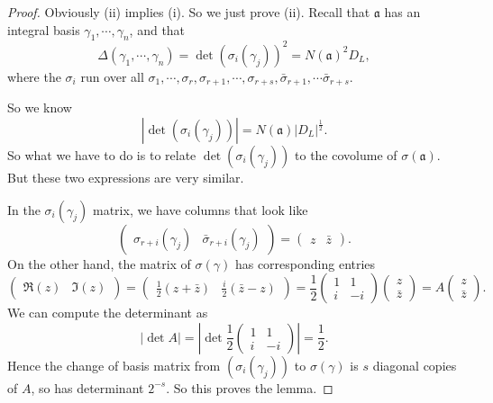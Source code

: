 \documentclass[a4paper]{article}
\begin{document}
\begin{proof}
  Obviously (ii) implies (i). So we just prove (ii). Recall that $\mathfrak{a}$ has an integral basis $\gamma_1, \cdots, \gamma_n$, and that
  \[
    \Delta(\gamma_1, \cdots, \gamma_n) = \det (\sigma_i(\gamma_j))^2 = N(\mathfrak{a})^2 D_L,
  \]
  where the $\sigma_i$ run over all $\sigma_1, \cdots, \sigma_r, \sigma_{r + 1}, \cdots, \sigma_{r + s}, \bar{\sigma}_{r + 1}, \cdots \bar{\sigma}_{r + s}$.

  So we know
  \[
    |\det (\sigma_i(\gamma_j))| = N(\mathfrak{a}) |D_L|^{\frac{1}{2}}.
  \]
  So what we have to do is to relate $\det(\sigma_i(\gamma_j))$ to the covolume of $\sigma(\mathfrak{a})$. But these two expressions are very similar.

  In the $\sigma_i (\gamma_j)$ matrix, we have columns that look like
  \[
    \begin{pmatrix}
      \sigma_{r + i}(\gamma_j) & \bar{\sigma}_{r + i}(\gamma_j)
    \end{pmatrix} =
    \begin{pmatrix}
      z & \bar{z}
    \end{pmatrix}.
  \]
  On the other hand, the matrix of $\sigma(\gamma)$ has corresponding entries
  \[
    \begin{pmatrix}
      \Re(z) & \Im(z)
    \end{pmatrix} =
    \begin{pmatrix}
      \frac{1}{2}(z + \bar{z}) &\frac{i}{2}(\bar{z} - z)
    \end{pmatrix} =
    \frac{1}{2}
    \begin{pmatrix}
      1 & 1\\
      i & -i
    \end{pmatrix}
    \begin{pmatrix}
      z\\\bar{z}
    \end{pmatrix} = A\begin{pmatrix}
      z\\\bar{z}
    \end{pmatrix}.
  \]
  We can compute the determinant as
  \[
    |\det A| = \left|\det \frac{1}{2}
    \begin{pmatrix}
      1 & 1\\
      i & -i
    \end{pmatrix}\right| = \frac{1}{2}.
  \]
  Hence the change of basis matrix from $(\sigma_i(\gamma_j))$ to $\sigma(\gamma)$ is $s$ diagonal copies of $A$, so has determinant $2^{-s}$. So this proves the lemma.
\end{proof}
\end{document}
